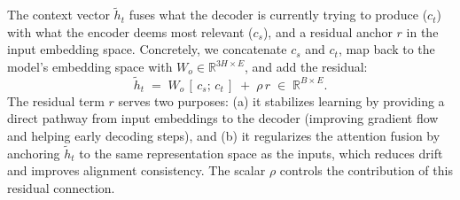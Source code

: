 The context vector $\tilde{h}_t$ fuses what the decoder is
currently trying to produce ($c_t$) with what the encoder deems most
relevant ($c_s$), and a residual anchor $r$ in the input embedding
space.
Concretely, we concatenate $c_s$ and $c_t$, map back to the model's
embedding space with $W_o\in\mathbb{R}^{3H\times E}$, and add the residual:
\[
\tilde{h}_t \;=\; W_o\,[\,c_s;\,c_t\,] \;+\; \rho\, r
\;\in\; \mathbb{R}^{B\times E}.
\]
The residual term $r$ serves two purposes: (a) it stabilizes learning by
providing a direct pathway from input embeddings to the decoder (improving
gradient flow and helping early decoding steps), and (b) it regularizes the
attention fusion by anchoring $\tilde{h}_t$ to the same representation space
as the inputs, which reduces drift and improves alignment consistency.
The scalar $\rho$ controls the contribution of this residual connection.


